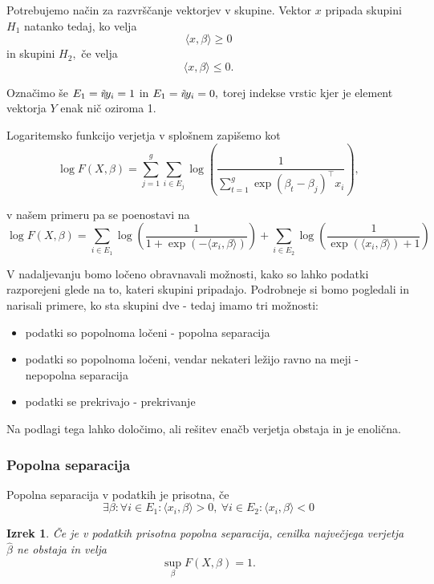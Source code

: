 \documentclass[12pt,a4paper]{amsart}
\theoremstyle{definition} %
\theoremstyle{plain} %
\newtheorem{izrek}[definicija]{Izrek}
\begin{document}
Potrebujemo način za razvrščanje vektorjev v skupine. Vektor $x$ pripada skupini $H_{1}$ natanko tedaj, ko velja
\[
    \langle x,\beta \rangle \geq 0
\]
in skupini $H_{2},$ če velja
\[
    \langle x,\beta \rangle \leq 0.
\]

Označimo še $E_{1} = {i \vline y_{i} = 1}$ in $E_{1} = {i \vline y_{i} = 0},$ torej indekse vrstic kjer je element vektorja $Y$ enak nič oziroma 1.


Logaritemsko funkcijo verjetja v splošnem zapišemo kot
\[
    \log F(X,\beta) = \sum_{j=1}^{g}\sum_{i\in E_{j}}\log\left(\frac{1}{\sum_{t=1}^{g} \exp(\beta_{t}-\beta_{j})^\top x_{i}}\right),
\]

v našem primeru pa se poenostavi na
\begin{equation*}
\log F(X,\beta) = \sum_{i\in E_{1}} \log\left(\frac{1}{1+\exp(-\langle x_{i},\beta \rangle)}\right) + \sum_{i\in E_{2}}\log\left(\frac{1}{\exp(\langle x_{i},\beta \rangle) + 1}\right)
\end{equation*}

V nadaljevanju bomo ločeno obravnavali možnosti, kako so lahko podatki razporejeni glede na to, kateri skupini pripadajo. Podrobneje si bomo pogledali in narisali
primere, ko sta skupini dve - tedaj imamo tri možnosti:
\begin{itemize}
    \item podatki so popolnoma ločeni - popolna separacija
    \item podatki so popolnoma ločeni, vendar nekateri ležijo ravno na meji - nepopolna separacija
    \item podatki se prekrivajo - prekrivanje
\end{itemize}
Na podlagi tega lahko določimo, ali rešitev enačb verjetja obstaja in je enolična.

\subsubsection{Popolna separacija}
Popolna separacija v podatkih je prisotna, če 
\[
    \exists \beta: \forall i \in E_{1}: \langle x_{i},\beta \rangle > 0,~
    \forall i \in E_{2}: \langle x_{i},\beta \rangle < 0
\]


\begin{izrek}
    Če je v podatkih prisotna popolna separacija, cenilka največjega verjetja $\hat{\beta}$ ne obstaja in velja
    \[
        \sup_{\beta} F(X,\beta) = 1.
    \]
\end{izrek}
\end{document}
